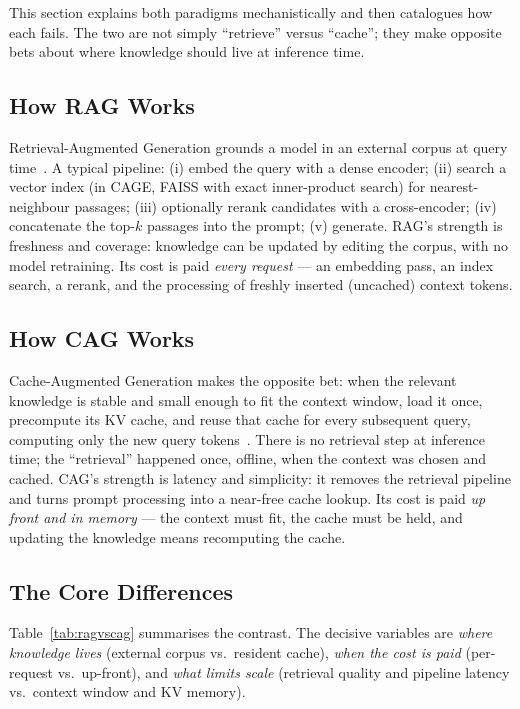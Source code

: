 \documentclass[12pt,a4paper]{article}
\let\cite\citep
\begin{document}
This section explains both paradigms mechanistically and then catalogues how each
fails. The two are not simply ``retrieve'' versus ``cache''; they make opposite
bets about where knowledge should live at inference time.

\subsection{How RAG Works}

Retrieval-Augmented Generation grounds a model in an external corpus at query
time~\cite{lewis2020retrieval}. A typical pipeline: (i) embed the query with a
dense encoder; (ii) search a vector index (in CAGE, FAISS with exact inner-product
search) for nearest-neighbour passages; (iii) optionally rerank candidates with a
cross-encoder; (iv) concatenate the top-$k$ passages into the prompt; (v) generate.
RAG's strength is freshness and coverage: knowledge can be updated by editing the
corpus, with no model retraining. Its cost is paid \emph{every request} --- an
embedding pass, an index search, a rerank, and the processing of freshly inserted
(uncached) context tokens.

\subsection{How CAG Works}

Cache-Augmented Generation makes the opposite bet: when the relevant knowledge is
stable and small enough to fit the context window, load it once, precompute its KV
cache, and reuse that cache for every subsequent query, computing only the new
query tokens~\cite{yu2024dontdorag}. There is no retrieval step at inference time;
the ``retrieval'' happened once, offline, when the context was chosen and cached.
CAG's strength is latency and simplicity: it removes the retrieval pipeline and
turns prompt processing into a near-free cache lookup. Its cost is paid \emph{up
front and in memory} --- the context must fit, the cache must be held, and updating
the knowledge means recomputing the cache.

\subsection{The Core Differences}

Table~\ref{tab:ragvscag} summarises the contrast. The decisive variables are
\emph{where knowledge lives} (external corpus vs.\ resident cache), \emph{when the
cost is paid} (per-request vs.\ up-front), and \emph{what limits scale} (retrieval
quality and pipeline latency vs.\ context window and KV memory).
\end{document}
